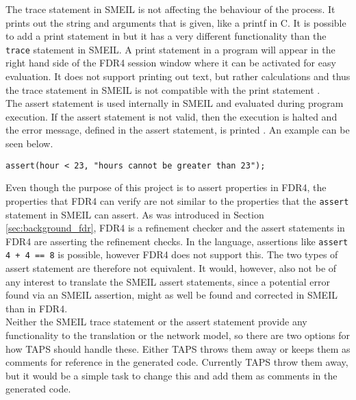 The trace statement in SMEIL is not affecting the behaviour of the process. It prints out the string and arguments that is given, like a printf in C. It is possible to add a print statement in \cspm{} but it has a very different functionality than the \texttt{trace} statement in SMEIL. A print statement in a \cspm{} program will appear in the right hand side of the FDR4 session window where it can be activated for easy evaluation. It does not support printing out text, but rather calculations and thus the trace statement in SMEIL is not compatible with the print statement \cspm.\\

The assert statement is used internally in SMEIL and evaluated during program execution. If the assert statement is not valid, then the execution is halted and the error message, defined in the assert statement, is printed . An example can be seen below.
\begin{verbatim}
assert(hour < 23, "hours cannot be greater than 23");
\end{verbatim}
Even though the purpose of this project is to assert properties in FDR4, the properties that FDR4 can verify are not similar to the properties that the \texttt{assert} statement in SMEIL can assert. As was introduced in Section \ref{sec:background_fdr}, FDR4 is a refinement checker and the assert statements in FDR4 are asserting the refinement checks. In the \cspm language, assertions like \texttt{assert 4 + 4 == 8} is possible, however FDR4 does not support this\cite{fdr4}. The two types of assert statement are therefore not equivalent. It would, however, also not be of any interest to translate the SMEIL assert statements, since a potential error found via an SMEIL assertion, might as well be found and corrected in SMEIL than in FDR4.\\

Neither the SMEIL trace statement or the assert statement provide any functionality to the translation or the network model, so there are two options for how TAPS should handle these. Either TAPS throws them away or keeps them as comments for reference in the generated code. Currently TAPS throw them away, but it would be a simple task to change this and add them as comments in the generated \cspm{} code.\\

